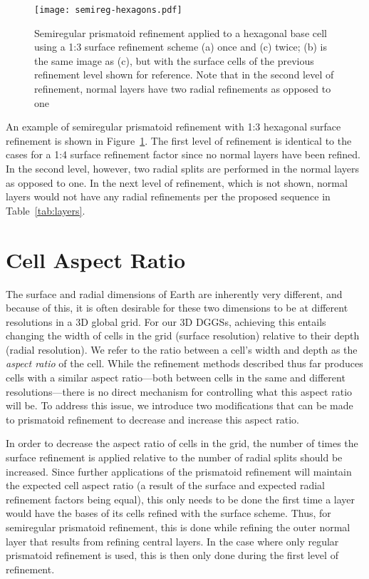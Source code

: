 \begin{figure}[htp!]
	\centering
	\texttt{[image: semireg-hexagons.pdf]}
	\caption[Semiregular prismatoid refinement for hexagons]{
		Semiregular prismatoid refinement applied to a hexagonal base cell using a 1:3 surface refinement scheme (a) once and (c) twice; (b) is the same image as (c), but with the surface cells of the previous refinement level shown for reference.
		Note that in the second level of refinement, normal layers have two radial refinements as opposed to one
	}
	\label{fig:hexagons}
\end{figure}


An example of semiregular prismatoid refinement with 1:3 hexagonal surface refinement is shown in Figure~\ref{fig:hexagons}.
The first level of refinement is identical to the cases for a 1:4 surface refinement factor since no normal layers have been refined.
In the second level, however, two radial splits are performed in the normal layers as opposed to one.
In the next level of refinement, which is not shown, normal layers would not have any radial refinements per the proposed sequence in Table~\ref{tab:layers}.


\section{Cell Aspect Ratio} \label{chap:5:ar}
The surface and radial dimensions of Earth are inherently very different, and because of this, it is often desirable for these two dimensions to be at different resolutions in a 3D global grid.
For our 3D DGGSs, achieving this entails changing the width of cells in the grid (surface resolution) relative to their depth (radial resolution).
We refer to the ratio between a cell's width and depth as the \textit{aspect ratio} of the cell.
While the refinement methods described thus far produces cells with a similar aspect ratio---both between cells in the same and different resolutions---there is no direct mechanism for controlling what this aspect ratio will be.
To address this issue, we introduce two modifications that can be made to prismatoid refinement to decrease and increase this aspect ratio.


In order to decrease the aspect ratio of cells in the grid, the number of times the surface refinement is applied relative to the number of radial splits should be increased.
Since further applications of the prismatoid refinement will maintain the expected cell aspect ratio (a result of the surface and expected radial refinement factors being equal), this only needs to be done the first time a layer would have the bases of its cells refined with the surface scheme.
Thus, for semiregular prismatoid refinement, this is done while refining the outer normal layer that results from refining central layers.
In the case where only regular prismatoid refinement is used, this is then only done during the first level of refinement.


